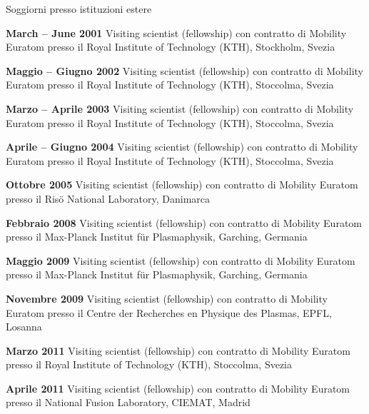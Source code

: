 \begin{statementblock}{Soggiorni presso istituzioni estere}
\end{statementblock}
\begin{enumerate}[label={[F\arabic*]}]

\item \textbf{March -- June 2001} Visiting scientist (fellowship) con
  contratto di Mobility Euratom presso il Royal Institute of 
  Technology (KTH), Stockholm, Svezia

\item \textbf{Maggio -- Giugno 2002} Visiting scientist (fellowship) con
  contratto di Mobility Euratom presso il Royal Institute of
  Technology (KTH), Stoccolma, Svezia

  \item \textbf{Marzo -- Aprile 2003} Visiting scientist (fellowship) con
  contratto di Mobility Euratom presso il Royal Institute of
  Technology (KTH), Stoccolma, Svezia

\item \textbf{Aprile -- Giugno 2004} Visiting scientist (fellowship) con
  contratto di Mobility Euratom presso il Royal Institute of
  Technology (KTH), Stoccolma, Svezia

\item \textbf{Ottobre 2005} Visiting scientist (fellowship) con
  contratto di Mobility Euratom presso il Ris{\"o} National
  Laboratory,  Danimarca

\item \textbf{Febbraio 2008} Visiting scientist (fellowship) con
  contratto di Mobility Euratom presso il Max-Planck
Institut f\"ur Plasmaphysik, Garching, Germania

\item \textbf{Maggio 2009} Visiting scientist (fellowship) con
  contratto di Mobility Euratom presso il Max-Planck
Institut f\"ur Plasmaphysik, Garching, Germania

\item \textbf{Novembre 2009} Visiting scientist (fellowship) con
  contratto di Mobility Euratom presso il Centre der Recherches en
  Physique des Plasmas, EPFL,  Losanna

\item \textbf{Marzo 2011} Visiting scientist (fellowship) con
  contratto di Mobility Euratom presso il Royal Institute of
  Technology (KTH), Stoccolma, Svezia

\item \textbf{Aprile 2011} Visiting scientist (fellowship) con
  contratto di Mobility Euratom presso il National Fusion
  Laboratory, CIEMAT, Madrid


\end{enumerate}
